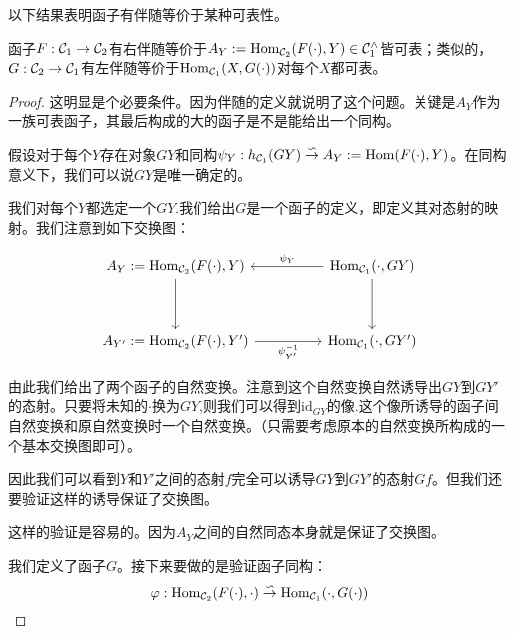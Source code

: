      以下结果表明函子有伴随等价于某种可表性。
     \begin{proposition}{}
        函子$F:\mathcal{C}_1 \to \mathcal{C}_2$有右伴随等价于$A_Y:=\mathrm{Hom}_{\mathcal{C}_2}(F(\cdot),Y)\in \mathcal{C}_1^{\wedge}$皆可表；类似的，$G:\mathcal{C}_2 \to \mathcal{C}_1$有左伴随等价于$\mathrm{Hom}_{\mathcal{C}_1}(X,G(\cdot))$对每个$X$都可表。
     \end{proposition}
     \begin{proof}
        这明显是个必要条件。因为伴随的定义就说明了这个问题。关键是$A_Y$作为一族可表函子，其最后构成的大的函子是不是能给出一个同构。

        假设对于每个$Y$存在对象$GY$和同构$\psi_Y:h_{\mathcal{C}_1}(GY)\overset{\backsim}{\to} A_Y:=\mathrm{Hom}(F(\cdot),Y)$。在同构意义下，我们可以说$GY$是唯一确定的。

        我们对每个$Y$都选定一个$GY$.我们给出$G$是一个函子的定义，即定义其对态射的映射。我们注意到如下交换图：

        \[
            \centering
            \begin{tikzcd}
                {A_Y:=\mathrm{Hom}_{\mathcal{C}_2}(F(\cdot),Y)} && {\mathrm{Hom}_{\mathcal{C}_1}(\cdot,GY)} \\
                \\
                {A_{Y'}:=\mathrm{Hom}_{\mathcal{C}_2}(F(\cdot),Y')} && {\mathrm{Hom}_{\mathcal{C}_1}(\cdot,GY')}
                \arrow["{\psi_Y}"', from=1-3, to=1-1]
                \arrow[from=1-1, to=3-1]
                \arrow["{\psi_{Y'}^{-1}}"', from=3-1, to=3-3]
                \arrow[from=1-3, to=3-3]
            \end{tikzcd}
        \]

        由此我们给出了两个函子的自然变换。注意到这个自然变换自然诱导出$GY$到$GY'$的态射。只要将未知的$\cdot$换为$GY$,则我们可以得到$\mathrm{id}_{GY}$的像.这个像所诱导的函子间自然变换和原自然变换时一个自然变换。（只需要考虑原本的自然变换所构成的一个基本交换图即可）。

        因此我们可以看到$Y$和$Y'$之间的态射$f$完全可以诱导$GY$到$GY'$的态射$Gf$。但我们还要验证这样的诱导保证了交换图。

        这样的验证是容易的。因为$A_Y$之间的自然同态本身就是保证了交换图。

        我们定义了函子$G$。接下来要做的是验证函子同构：
        $$
        \varphi:\mathrm{Hom}_{\mathcal{C}_2}(F(\cdot),\cdot) \overset{\backsim}{\to} \mathrm{Hom}_{\mathcal{C}_1}(\cdot,G(\cdot))
        $$


\end{proof}
